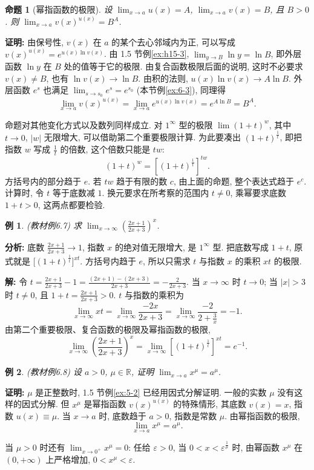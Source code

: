 \documentclass[UTF8,openany]{ctexbook}
\theoremstyle{chinesetextbook}
\newtheorem{example}{例}[section]
\newenvironment{cnproof}{\par\indent\textbf{证明:} \ignorespaces}{\par}
\newenvironment{cnsolution}{\par\indent\textbf{解:} \ignorespaces}{\par}
\newtheorem*{propositionsingle}{命题}
\begin{document}
\begin{propositionsingle}[幂指函数的极限]
设 $\displaystyle\lim_{x\to a}u(x)=A$, $\displaystyle\lim_{x\to a}v(x)=B$, 且 $B>0$. 则 $\displaystyle\lim_{x\to a}v(x)^{u(x)}=B^A$.
\end{propositionsingle}
\begin{cnproof}
由保号性, $v(x)$ 在 $a$ 的某个去心邻域内为正, 可以写成 $v(x)^{u(x)}=e^{u(x)\ln v(x)}$. 由 1.5 节例\ref{ex:h15-3}, $\displaystyle\lim_{y\to B}\ln y=\ln B$, 即外层函数 $\ln y$ 在 $B$ 处的值等于它的极限. 由复合函数极限后面的说明, 这时不必要求 $v(x)\ne B$, 也有 $\ln v(x)\to\ln B$. 由积的法则, $u(x)\ln v(x)\to A\ln B$. 外层函数 $e^s$ 也满足 $\displaystyle\lim_{s\to s_0}e^s=e^{s_0}$ (本节例\ref{ex:6-3}), 同理得
\[
\lim_{x\to a}v(x)^{u(x)}=\lim_{x\to a}e^{u(x)\ln v(x)}=e^{A\ln B}=B^A.
\]
\end{cnproof}
命题对其他变化方式以及数列同样成立. 对 $1^\infty$ 型的极限 $\displaystyle\lim(1+t)^w$, 其中 $t\to0$, $|w|$ 无限增大, 可以借助第二个重要极限计算. 为此要凑出 $(1+t)^{\frac1t}$, 即把指数 $w$ 写成 $\displaystyle\frac1t$ 的倍数, 这个倍数只能是 $tw$:
\[
(1+t)^w=\left[(1+t)^{\frac1t}\right]^{tw}.
\]
方括号内的部分趋于 $e$. 若 $tw$ 趋于有限的数 $c$, 由上面的命题, 整个表达式趋于 $e^c$. 计算时, 令 $t$ 等于底数减 $1$. 换元要求在所考察的范围内 $t\ne0$, 乘幂要求底数 $1+t>0$, 这两点都要检验.
\begin{example}\label{ex:6-7}
\textnormal{(教材例6.7)} 求 $\displaystyle\lim_{x\to\infty}\left(\frac{2x+1}{2x+3}\right)^x$.
\end{example}
\par\indent\textbf{分析:} 底数 $\displaystyle\frac{2x+1}{2x+3}\to1$, 指数 $x$ 的绝对值无限增大, 是 $1^\infty$ 型. 把底数写成 $1+t$, 原式就是 $\bigl[(1+t)^{\frac1t}\bigr]^{xt}$. 方括号内趋于 $e$, 所以只需求 $t$ 与指数 $x$ 的乘积 $xt$ 的极限.
\begin{cnsolution}
令 $\displaystyle t=\frac{2x+1}{2x+3}-1=\frac{(2x+1)-(2x+3)}{2x+3}=-\frac2{2x+3}$. 当 $x\to\infty$ 时 $t\to0$; 当 $|x|>3$ 时 $t\ne0$, 且 $\displaystyle1+t=\frac{2x+1}{2x+3}>0$. $t$ 与指数的乘积为
\[
\lim_{x\to\infty}xt=\lim_{x\to\infty}\frac{-2x}{2x+3}=\lim_{x\to\infty}\frac{-2}{2+\frac3x}=-1.
\]
由第二个重要极限、复合函数的极限及幂指函数的极限,
\[
\lim_{x\to\infty}\left(\frac{2x+1}{2x+3}\right)^x=\lim_{x\to\infty}\left[(1+t)^{\frac1t}\right]^{xt}=e^{-1}.
\]
\end{cnsolution}
\begin{example}\label{ex:6-8}
\textnormal{(教材例6.8)} 设 $a>0$, $\mu\in\mathbb R$, 证明 $\displaystyle\lim_{x\to a}x^\mu=a^\mu$.
\end{example}
\begin{cnproof}
$\mu$ 是正整数时, 1.5 节例\ref{ex:5-2} 已经用因式分解证明. 一般的实数 $\mu$ 没有这样的因式分解. 但 $x^\mu$ 是幂指函数 $v(x)^{u(x)}$ 的特殊情形, 其底数 $v(x)=x$, 指数 $u(x)\equiv\mu$. 当 $x\to a$ 时, 底数趋于 $a>0$, 指数是常数 $\mu$. 由幂指函数的极限,
\[
\lim_{x\to a}x^\mu=a^\mu.
\]
\end{cnproof}
当 $\mu>0$ 时还有 $\displaystyle\lim_{x\to0^+}x^\mu=0$: 任给 $\varepsilon>0$, 当 $0<x<\varepsilon^{\frac1\mu}$ 时, 由幂函数 $x^\mu$ 在 $(0,+\infty)$ 上严格增加, $0<x^\mu<\varepsilon$.
\end{document}
